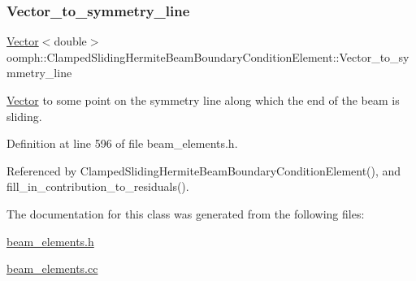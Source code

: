 \subsubsection{\texorpdfstring{Vector\+\_\+to\+\_\+symmetry\+\_\+line}{Vector\_to\_symmetry\_line}}
{\footnotesize\ttfamily \hyperlink{classoomph_1_1Vector}{Vector}$<$double$>$ oomph\+::\+Clamped\+Sliding\+Hermite\+Beam\+Boundary\+Condition\+Element\+::\+Vector\+\_\+to\+\_\+symmetry\+\_\+line\hspace{0.3cm}{\ttfamily [private]}}



\hyperlink{classoomph_1_1Vector}{Vector} to some point on the symmetry line along which the end of the beam is sliding. 



Definition at line 596 of file beam\+\_\+elements.\+h.



Referenced by Clamped\+Sliding\+Hermite\+Beam\+Boundary\+Condition\+Element(), and fill\+\_\+in\+\_\+contribution\+\_\+to\+\_\+residuals().



The documentation for this class was generated from the following files\+:\begin{DoxyCompactItemize}
\item 
\hyperlink{beam__elements_8h}{beam\+\_\+elements.\+h}\item 
\hyperlink{beam__elements_8cc}{beam\+\_\+elements.\+cc}\end{DoxyCompactItemize}
